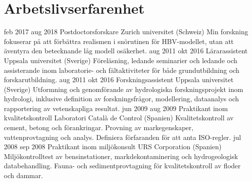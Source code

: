 \ifswedish
    \section{Arbetslivserfarenhet}
        \position
            {feb 2017 \textemdash{} aug 2018}
            {Postdoctorsforskare}
            {Zurich universitet (Schweiz)}
            {Min forskning fokuserar på att förbättra realismen i snörutinen för HBV-modellet, utan att äventyra den betecknande låg modell osäkerhet.}
        \position
            {aug 2011 \textemdash{} okt 2016}
            {Lärarassistent}
            {Uppsala universitet (Sverige)}
            {Föreläsning, ledande seminarier och ledande och assisterande inom laboratorie- och fältaktiviteter för både grundutbildning och forskarutbildning.}
        \position
            {aug 2011 \textemdash{} okt 2016}
            {Forskningsassistent}
            {Uppsala universitet (Sverige)}
            {Utformning och genomförande av hydrologiska forskningsprojekt inom hydrologi, inklusive definition av forskningsfrågor, modellering, dataanalys och rapportering av vetenskapliga resultat.}
        \position
            {jun 2009 \textemdash{} aug 2009}
            {Praktikant inom kvalitetskontroll}
            {Laboratori Català de Control (Spanien)}
            {Kvalitetskontroll av cement, betong och förankringar. Provning av markegenskaper, vattenprovtagning och analys. Definiera förfaranden för att anta ISO-regler.}
        \position
            {jul 2008 \textemdash{} sep 2008}
            {Praktikant inom miljökonsult}
            {URS Corporation (Spanien)}
            {Miljökontrolltest av bensinstationer, markdekontaminering och hydrogeologisk databehandling. Fauna- och sedimentprovtagning för kvalitetskontroll av floder och dammar.}
\else
